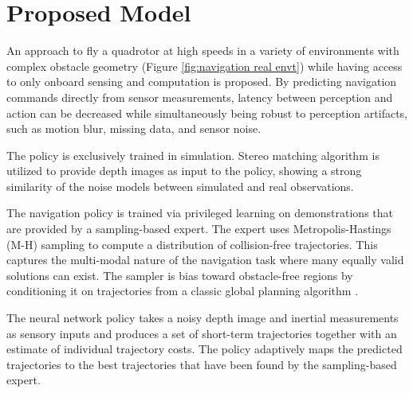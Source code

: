 \section{Proposed Model}
An approach to fly a quadrotor at high speeds in a variety of environments with complex obstacle geometry (Figure \ref{fig:navigation real envt}) while having access to only onboard sensing and computation is proposed. By predicting navigation commands directly from sensor
measurements, latency between perception and action can be decreased while simultaneously being robust to perception artifacts, such
as motion blur, missing data, and sensor noise. 

The policy is exclusively trained in simulation. Stereo matching algorithm \cite{stereoMatching} is utilized to provide depth images as input
to the policy, showing a strong similarity of the noise models between simulated and real observations.

The navigation policy is trained via privileged learning on
demonstrations that are provided by a sampling-based expert. The expert
uses Metropolis-Hastings \cite{MH_hasting} (M-H) sampling to compute a distribution of collision-free trajectories. This captures the multi-modal nature of the navigation task where many equally valid solutions can exist. The sampler is bias toward obstacle-free regions by conditioning it on trajectories from a classic global planning algorithm \cite{global_planning}.

The neural network policy takes a noisy depth image and inertial measurements as sensory inputs and produces a set of short-term trajectories together with an estimate of individual trajectory costs. The policy
adaptively maps the predicted trajectories to the best trajectories that have been found by the sampling-based expert.  

